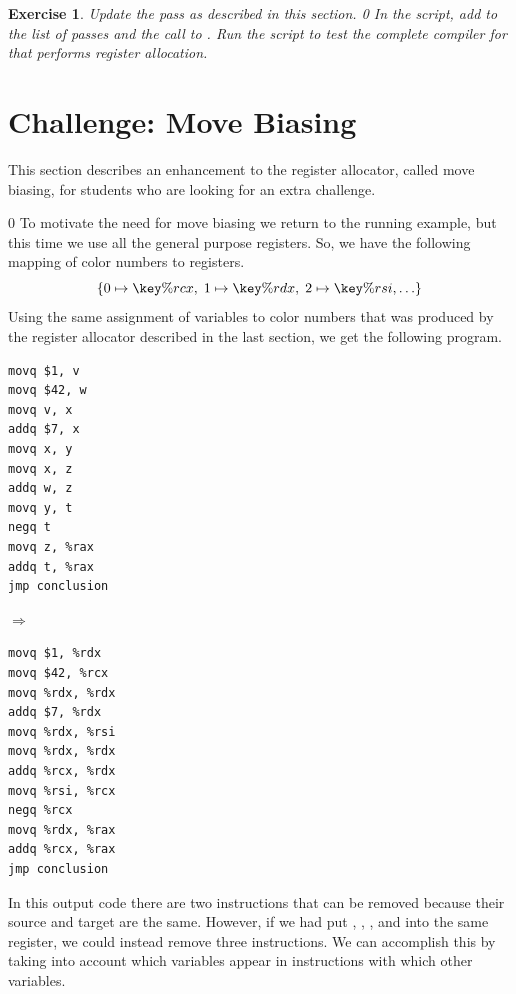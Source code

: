 \documentclass[7x10]{TimesAPriori_MIT}%
\def\racketEd{0}
\def\edition{0}
\newcommand{\racket}[1]{{\if\edition\racketEd{#1}\fi}}
\newtheorem{exercise}[theorem]{Exercise}
\numberwithin{theorem}{chapter}
\numberwithin{definition}{chapter}
\numberwithin{equation}{chapter}
\begin{document}
\begin{exercise}\normalfont\normalsize
Update the  pass as described in this section.
%
\racket{
In the  script, add \code{prelude\_and\_conclusion} to the
list of passes and the call to \code{compiler-tests}.}
%
Run the script to test the complete compiler for \LangVar{} that
performs register allocation.
\end{exercise}

\section{Challenge: Move Biasing}
\label{sec:move-biasing}

This section describes an enhancement to the register allocator,
called move biasing, for students who are looking for an extra
challenge.

{\if\edition\racketEd      
To motivate the need for move biasing we return to the running example,
but this time we use all the general purpose registers. So, we have
the following mapping of color numbers to registers.
\[
  \{ 0 \mapsto \key{\%rcx}, \; 1 \mapsto \key{\%rdx}, \; 2 \mapsto \key{\%rsi}, \ldots \}
\]
Using the same assignment of variables to color numbers that was
produced by the register allocator described in the last section, we
get the following program.
\begin{center}
\begin{minipage}{0.3\textwidth}
\begin{lstlisting}
movq $1, v
movq $42, w
movq v, x
addq $7, x
movq x, y
movq x, z
addq w, z
movq y, t
negq t
movq z, %rax
addq t, %rax
jmp conclusion
\end{lstlisting}
\end{minipage}
$\Rightarrow\qquad$
\begin{minipage}{0.45\textwidth}
\begin{lstlisting}
movq $1, %rdx
movq $42, %rcx
movq %rdx, %rdx
addq $7, %rdx
movq %rdx, %rsi
movq %rdx, %rdx
addq %rcx, %rdx
movq %rsi, %rcx
negq %rcx
movq %rdx, %rax
addq %rcx, %rax
jmp conclusion
\end{lstlisting}
\end{minipage}
\end{center}
In this output code there are two  instructions that
can be removed because their source and target are the same.  However,
if we had put , , , and  into the same
register, we could instead remove three  instructions.  We
can accomplish this by taking into account which variables appear in
 instructions with which other variables.
\fi}
\end{document}
